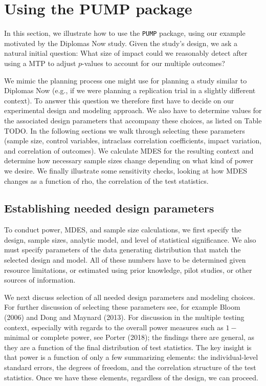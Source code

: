 \documentclass[
]{article}
\begin{document}
\section{Using the PUMP package}
\label{sec:vignette}

In this section, we illustrate how to use the \texttt{PUMP} package,
using our example motivated by the Diplomas Now study. Given the study's
design, we ask a natural initial question: What size of impact could we
reasonably detect after using a MTP to adjust \(p\)-values to account
for our multiple outcomes?

We mimic the planning process one might use for planning a study similar
to Diplomas Now (e.g., if we were planning a replication trial in a
slightly different context). To answer this question we therefore first
have to decide on our experimental design and modeling approach. We also
have to determine values for the associated design parameters that
accompany these choices, as listed on Table TODO. In the following
sections we walk through selecting these parameters (sample size,
control variables, intraclass correlation coefficients, impact
variation, and correlation of outcomes). We calculate MDES for the
resulting context and determine how necessary sample sizes change
depending on what kind of power we desire. We finally illustrate some
sensitivity checks, looking at how MDES changes as a function of rho,
the correlation of the test statistics.

\subsection{Establishing needed design parameters}

To conduct power, MDES, and sample size calculations, we first specify
the design, sample sizes, analytic model, and level of statistical
significance. We also must specify parameters of the data generating
distribution that match the selected design and model. All of these
numbers have to be determined given resource limitations, or estimated
using prior knowledge, pilot studies, or other sources of information.

We next discuss selection of all needed design parameters and modeling
choices. For further discussion of selecting these parameters see, for
example Bloom (2006) and Dong and Maynard (2013). For discussion in the
multiple testing context, especially with regards to the overall power
measures such as \(1-\)minimal or complete power, see Porter (2018); the
findings there are general, as they are a function of the final
distribution of test statistics. The key insight is that power is a
function of only a few summarizing elements: the individual-level
standard errors, the degrees of freedom, and the correlation structure
of the test statistics. Once we have these elements, regardless of the
design, we can proceed.
\end{document}
